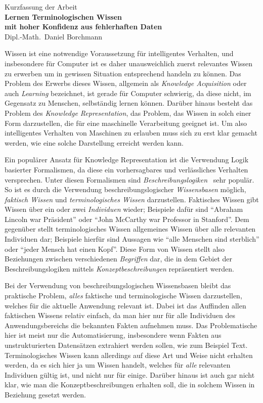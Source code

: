 \documentclass[ngerman,fleqn,DIV=12]{scrartcl}
\begin{document}
\medskip
\begin{center}
  \normalsize Kurzfassung der Arbeit\\
  \LARGE\textbf{Lernen Terminologischen Wissen\\ mit hoher Konfidenz aus fehlerhaften Daten}\\
  \bigskip%
  \large Dipl.-Math.\ Daniel Borchmann
\end{center}
\bigskip
\bigskip

\noindent
Wissen ist eine notwendige Voraussetzung für intelligentes Verhalten, und insbesondere für
Computer ist es daher unausweichlich zuerst relevantes Wissen zu erwerben um in gewissen
Situation entsprechend handeln zu können.  Das Problem des Erwerbs dieses Wissen,
allgemein als \emph{Knowledge Acquisition} oder auch \emph{Learning} bezeichnet, ist
gerade für Computer schwierig, da diese nicht, im Gegensatz zu Menschen, selbständig
lernen können.  Darüber hinaus besteht das Problem des \emph{Knowledge Representation},
\dh das Problem, das Wissen in solch einer Form darzustellen, die für eine maschinelle
Verarbeitung geeignet ist.  Um also intelligentes Verhalten von Maschinen zu erlauben muss
sich zu erst klar gemacht werden, wie eine solche Darstellung erreicht werden kann.

Ein populärer Ansatz für Knowledge Representation ist die Verwendung Logik basierter
Formalismen, da diese ein vorhersagbares und verlässliches Verhalten versprechen.  Unter
diesen Formalismen sind \emph{Beschreibungslogiken}~\cite{DLhandbook} sehr populär.  So
ist es durch die Verwendung beschreibungslogischer \emph{Wissensbasen} möglich,
\emph{faktisch Wissen} und \emph{terminologisches Wissen} darzustellen.  Faktisches Wissen
gibt Wissen über ein oder zwei \emph{Individuen} wieder; Beispiele dafür sind
\enquote{Abraham Lincoln war Präsident} oder \enquote{John McCarthy war Professor in
  Stanford}.  Dem gegenüber stellt terminologisches Wissen allgemeines Wissen über alle
relevanten Individuen dar; Beispiele hierfür sind Aussagen wie \enquote{alle Menschen sind
  sterblich} oder \enquote{jeder Mensch hat einen Kopf}.  Diese Form von Wissen stellt
also Beziehungen zwischen verschiedenen \emph{Begriffen} dar, die in dem Gebiet der
Beschreibungslogiken mittels \emph{Konzeptbeschreibungen} repräsentiert werden.

Bei der Verwendung von beschreibungslogischen Wissensbasen bleibt das praktische Problem,
\emph{alles} faktische und terminologische Wissen darzustellen, welches für die aktuelle
Anwendung relevant ist.  Dabei ist das Auffinden allen faktischen Wissens relativ einfach,
da man hier nur für alle Individuen des Anwendungsbereichs die bekannten Fakten aufnehmen
muss.  Das Problematische hier ist meist nur die Automatisierung, insbesondere wenn Fakten
aus unstrukturierten Datensätzen extrahiert werden sollen, wie zum Beispiel Text.
Terminologisches Wissen kann allerdings auf diese Art und Weise nicht erhalten werden, da
es sich hier ja um Wissen handelt, welches für \emph{alle} relevanten Individuen gültig
ist, und nicht nur für einige.  Darüber hinaus ist auch gar nicht klar, wie man die
Konzeptbeschreibungen erhalten soll, die in solchem Wissen in Beziehung gesetzt werden.
\end{document}

